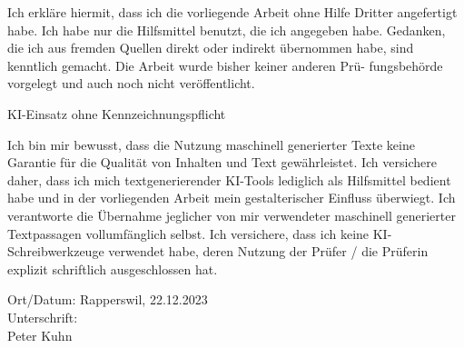 \newpage
Ich erkläre hiermit, dass ich die vorliegende Arbeit ohne Hilfe Dritter angefertigt habe. Ich habe nur
die Hilfsmittel benutzt, die ich angegeben habe. Gedanken, die ich aus fremden Quellen direkt oder
indirekt übernommen habe, sind kenntlich gemacht. Die Arbeit wurde bisher keiner anderen Prü-
fungsbehörde vorgelegt und auch noch nicht veröffentlicht.

KI-Einsatz ohne Kennzeichnungspflicht 

Ich bin mir bewusst, dass die Nutzung maschinell generierter Texte keine Garantie für die Qualität von Inhalten und Text gewährleistet. Ich versichere daher, dass ich mich textgenerierender KI-Tools lediglich als Hilfsmittel bedient habe und in der vorliegenden Arbeit mein gestalterischer Einfluss überwiegt. Ich verantworte die Übernahme jeglicher von mir verwendeter maschinell generierter Textpassagen vollumfänglich selbst. Ich versichere, dass ich keine KI-Schreibwerkzeuge verwendet habe, deren Nutzung der Prüfer / die Prüferin explizit schriftlich ausgeschlossen hat. 


Ort/Datum: Rapperswil, 22.12.2023 \\
Unterschrift:\\
Peter Kuhn
